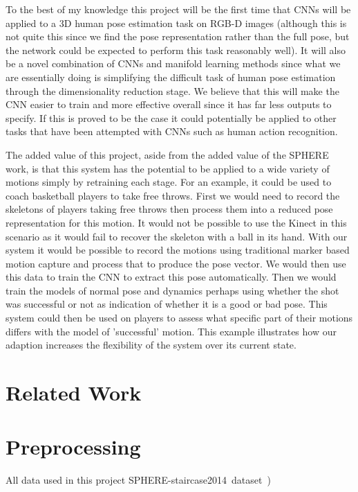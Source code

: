 \documentclass[11pt]{article} %
\begin{document}
To the best of my knowledge this project will be the first time that CNNs will be applied to a 3D human pose estimation task on RGB-D images (although this is not quite this since we find the pose representation rather than the full pose, but the network could be expected to perform this task reasonably well). It will also be a novel combination of CNNs and manifold learning methods since what we are essentially doing is simplifying the difficult task of human pose estimation through the dimensionality reduction stage. We believe that this will make the CNN easier to train and more effective overall since it has far less outputs to specify. If this is proved to be the case it could potentially be applied to other tasks that have been attempted with CNNs such as human action recognition.

The added value of this project, aside from the added value of the SPHERE work, is that this system has the potential to be applied to a wide variety of motions simply by retraining each stage. For an example, it could be used to coach basketball players to take free throws. First we would need to record the skeletons of players taking free throws then process them into a reduced pose representation for this motion. It would not be possible to use the Kinect in this scenario as it would fail to recover the skeleton with a ball in its hand. With our system it would be possible to record the motions using traditional marker based motion capture and process that to produce the pose vector. We would then use this data to train the CNN to extract this pose automatically. Then we would train the models of normal pose and dynamics perhaps using whether the shot was successful or not as indication of whether it is a good or bad pose. This system could then be used on players to assess what specific part of their motions differs with the model of 'successful' motion. This example illustrates how our adaption increases the flexibility of the system over its current state.




\section{Related Work}







\section{Preprocessing}
\label{sec:intro}
All data used in this project SPHERE-staircase2014~dataset~\cite{Paiement}) 




\end{document}
